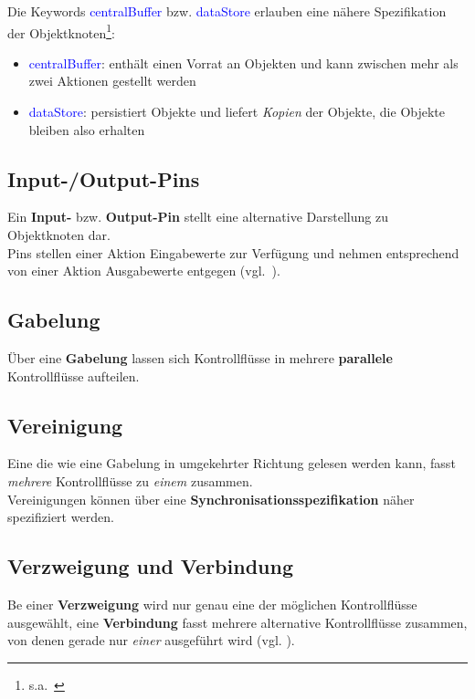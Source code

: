 Die Keywords \textcolor{blue}{\guillemotleft centralBuffer\guillemotright} bzw. \textcolor{blue}{\guillemotleft dataStore\guillemotright} erlauben eine nähere Spezifikation der Objektknoten\footnote{s.a.~\cite[398 f.]{OMG17}}:

\begin{itemize}
    \item \textcolor{blue}{\guillemotleft centralBuffer\guillemotright}: enthält einen Vorrat an Objekten und kann zwischen mehr als zwei Aktionen gestellt werden
    \item \textcolor{blue}{\guillemotleft dataStore\guillemotright}: persistiert Objekte und liefert \textit{Kopien} der Objekte, die Objekte bleiben also erhalten
\end{itemize}

\subsection{Input-/Output-Pins}
Ein \textbf{Input-} bzw. \textbf{Output-Pin} stellt eine alternative Darstellung zu Objektknoten dar.\\
Pins stellen einer Aktion Eingabewerte zur Verfügung und nehmen entsprechend von einer Aktion Ausgabewerte entgegen (vgl.~\cite[73 f.]{Bal05}).

\subsection{Gabelung}
Über eine \textbf{Gabelung} lassen sich Kontrollflüsse in mehrere \textbf{parallele} Kontrollflüsse aufteilen.

\subsection{Vereinigung}
Eine  die wie eine Gabelung in umgekehrter Richtung gelesen werden kann, fasst \textit{mehrere} Kontrollflüsse zu \textit{einem} zusammen.\\
Vereinigungen können über eine \textbf{Synchronisationsspezifikation} näher spezifiziert werden.

\subsection{Verzweigung und Verbindung}
Be einer \textbf{Verzweigung} wird nur genau eine der möglichen Kontrollflüsse ausgewählt, eine \textbf{Verbindung} fasst mehrere alternative  Kontrollflüsse zusammen, von denen gerade nur \textit{einer} ausgeführt wird (vgl. \cite[60]{Buh09}).

